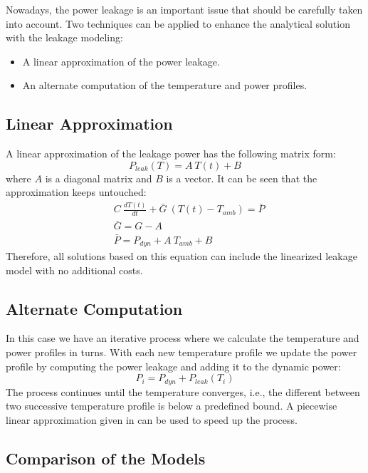   Nowadays, the power leakage is an important issue that should be carefully taken into account. Two techniques can be applied to enhance the analytical solution with the leakage modeling:
  \begin{itemize}
    \item A linear approximation of the power leakage.
    \item An alternate computation of the temperature and power profiles.
  \end{itemize}

\subsection{Linear Approximation}
A linear approximation of the leakage power has the following matrix form:
\[
  P_{leak}(T) = A \: T(t) + B
\]
where $A$ is a diagonal matrix and $B$ is a vector. It can be seen that the approximation keeps  untouched:
\begin{align*}
  & C \: \frac{dT(t)}{dt} + \bar{G} \: (T(t) - T_{amb}) = \bar{P} \\
  & \bar{G} = G - A \\
  & \bar{P} = P_{dyn} + A \: T_{amb} + B
\end{align*}
Therefore, all solutions based on this equation can include the linearized leakage model with no additional costs.

\subsection{Alternate Computation}
In this case we have an iterative process where we calculate the temperature and power profiles in turns. With each new temperature profile we update the power profile by computing the power leakage and adding it to the dynamic power:
\[
  P_i = P_{dyn} + P_{leak}(T_i)
\]
The process continues until the temperature converges, i.e., the different between two successive temperature profile is below a predefined bound. A piecewise linear approximation given in \cite{liu2007} can be used to speed up the process.

\subsection{Comparison of the Models}
